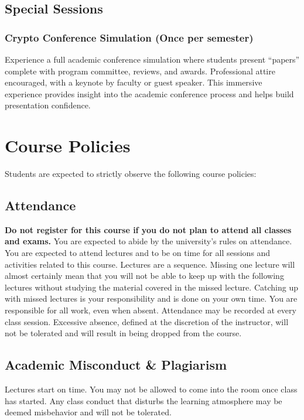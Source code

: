 \documentclass[10pt,a4paper,american]{exam}
\begin{document}
\subsection{Special Sessions}

\subsubsection*{Crypto Conference Simulation (Once per semester)}
Experience a full academic conference simulation where students present ``papers'' complete with program committee, reviews, and awards. Professional attire encouraged, with a keynote by faculty or guest speaker. This immersive experience provides insight into the academic conference process and helps build presentation confidence.

\section{Course Policies}
Students are expected to strictly observe the following course policies:

\subsection{Attendance}
\textbf{Do not register for this course if you do not plan to attend all classes and exams.} You are expected to abide by the university's rules on attendance. You are expected to attend lectures and to be on time for all sessions and activities related to this course. Lectures are a sequence. Missing one lecture will almost certainly mean that you will not be able to keep up with the following lectures without studying the material covered in the missed lecture. Catching up with missed lectures is your responsibility and is done on your own time. You are responsible for all work, even when absent. Attendance may be recorded at every class session. Excessive absence, defined at the discretion of the instructor, will not be tolerated and will result in being dropped from the course.

\subsection{Academic Misconduct \& Plagiarism}
Lectures start on time. You may not be allowed to come into the room once class has started. Any class conduct that disturbs the learning atmosphere may be deemed misbehavior and will not be tolerated.
\end{document}
